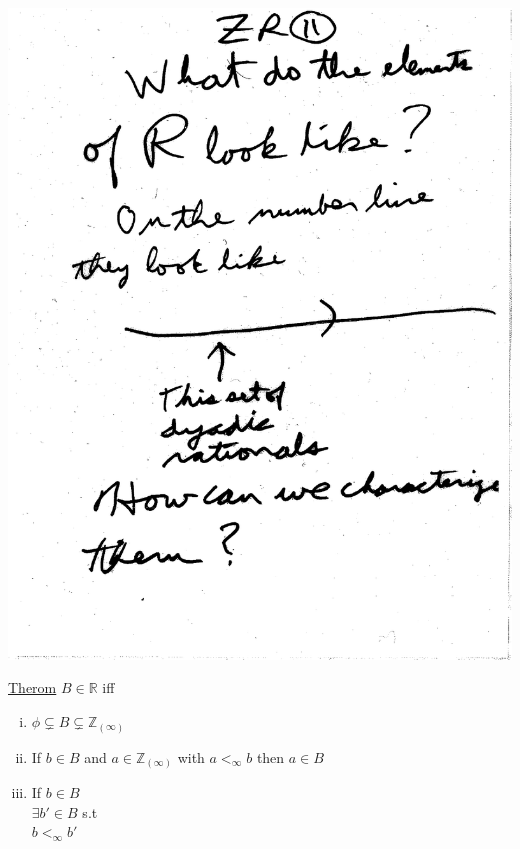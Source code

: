 \documentclass[10pt,a4paper]{article}
\begin{document}
{{\includegraphics[scale=.5]{Pages/ZR_11}

\newpage

\underline{Therom} $B \in \mathbb{R}$ iff
\begin{enumerate}[(i)] 
\item $\phi \subsetneq B \subsetneq \mathbb{Z}_{(\infty)}$ 
\item If $b \in B$ and $a \in \mathbb{Z}_{(\infty)}$ with $a <_\infty b$ then $a \in B$
\item If $b \in B$ 
\\ $\exists b' \in B$ s.t
\\ $b <_\infty b'$


\end{enumerate}}}
\end{document}
